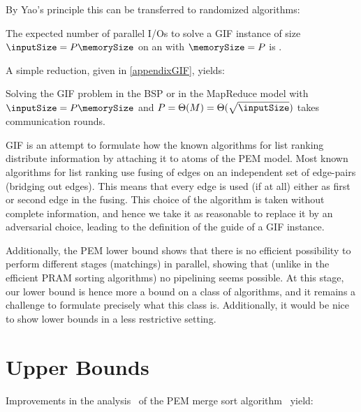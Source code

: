 \documentclass[envcountsame]{llncs}
\def\bOm#1{\printmath{\Omega \left(#1\right)}}
\begin{document}

By Yao's principle \cite{1977YaosPrinciple} this can be transferred to randomized algorithms: 

\begin{theorem}
  The expected number of parallel I/Os to solve a GIF instance of size~$\inputSize=P\memorySize$ on an \fusePEM with $\memorySize=P$ is \bOm{\log^2 \inputSize}.
\end{theorem}

A simple reduction, given in \autoref{appendixGIF}, yields:

\begin{theorem}
\label{theoremBSPMapReduceGIF}
Solving the GIF problem in the BSP or in the MapReduce model with $\inputSize = P\memorySize$ and $P = \Theta(M) = \Theta(\sqrt{\inputSize})$ takes \bOm{\log \inputSize} communication rounds.
\end{theorem}



GIF is an attempt to formulate how the known algorithms for list ranking distribute information by attaching it to atoms of the PEM model.
Most known algorithms for list ranking use fusing of edges on an independent set of edge-pairs (bridging out edges). This means that every edge is used (if at all) either as first or second edge in the fusing. 
This choice of the algorithm is taken without complete information, and hence we take it as reasonable to replace it by an adversarial choice, leading to the definition of the guide of a GIF instance.


Additionally, the PEM lower bound shows that there is no efficient possibility to perform different stages (matchings) in parallel, showing that (unlike in the efficient PRAM sorting algorithms) no pipelining seems possible.
At this stage, our lower bound is hence more a bound on a class of algorithms, and it remains a challenge to formulate precisely what this class is. 
Additionally, it would be nice to show lower bounds in a less restrictive setting. 




\section{Upper Bounds}
\label{sectionUpperBounds}

Improvements in the analysis~\cite{2012ThesisGero} of the PEM merge sort algorithm~\cite{2008ArgeEtAlFundamentalPEM} yield:
\end{document}
